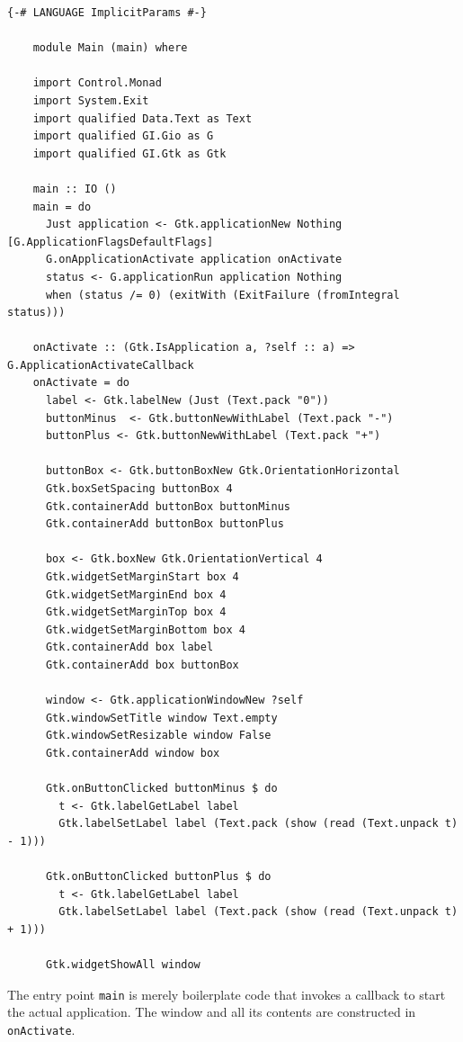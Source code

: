 \documentclass[UdineBachThesis,american,11pt]{PhdThesis}
\begin{document}
  \begin{Verbatim}[gobble=4,fontsize=\small]
    {-# LANGUAGE ImplicitParams #-}

    module Main (main) where

    import Control.Monad
    import System.Exit
    import qualified Data.Text as Text
    import qualified GI.Gio as G
    import qualified GI.Gtk as Gtk

    main :: IO ()
    main = do
      Just application <- Gtk.applicationNew Nothing [G.ApplicationFlagsDefaultFlags]
      G.onApplicationActivate application onActivate
      status <- G.applicationRun application Nothing
      when (status /= 0) (exitWith (ExitFailure (fromIntegral status)))

    onActivate :: (Gtk.IsApplication a, ?self :: a) => G.ApplicationActivateCallback
    onActivate = do
      label <- Gtk.labelNew (Just (Text.pack "0"))
      buttonMinus  <- Gtk.buttonNewWithLabel (Text.pack "-")
      buttonPlus <- Gtk.buttonNewWithLabel (Text.pack "+")

      buttonBox <- Gtk.buttonBoxNew Gtk.OrientationHorizontal
      Gtk.boxSetSpacing buttonBox 4
      Gtk.containerAdd buttonBox buttonMinus
      Gtk.containerAdd buttonBox buttonPlus

      box <- Gtk.boxNew Gtk.OrientationVertical 4
      Gtk.widgetSetMarginStart box 4
      Gtk.widgetSetMarginEnd box 4
      Gtk.widgetSetMarginTop box 4
      Gtk.widgetSetMarginBottom box 4
      Gtk.containerAdd box label
      Gtk.containerAdd box buttonBox

      window <- Gtk.applicationWindowNew ?self
      Gtk.windowSetTitle window Text.empty
      Gtk.windowSetResizable window False
      Gtk.containerAdd window box

      Gtk.onButtonClicked buttonMinus $ do
        t <- Gtk.labelGetLabel label
        Gtk.labelSetLabel label (Text.pack (show (read (Text.unpack t) - 1)))

      Gtk.onButtonClicked buttonPlus $ do
        t <- Gtk.labelGetLabel label
        Gtk.labelSetLabel label (Text.pack (show (read (Text.unpack t) + 1)))

      Gtk.widgetShowAll window
  \end{Verbatim}

  \vspace{-2pt}

  The entry point \mbox{\texttt{main}} is merely boilerplate code that invokes a
  callback to start the actual application. The window and all its contents are
  constructed in \mbox{\texttt{onActivate}}.
\end{document}
